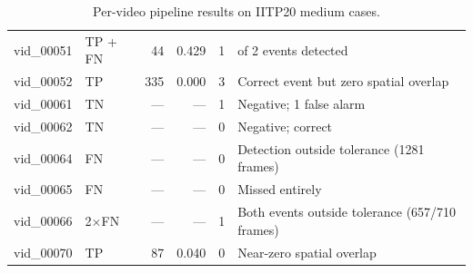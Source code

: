 \begin{table}[!htbp]
\begin{tabularx}{\textwidth}{l l r r c >{\raggedright\arraybackslash}X}
		\addlinespace
		vid\_00051     & TP + FN          & 44                   & 0.429        & 1                  & 1 of 2 events detected                         \\
		\addlinespace
		vid\_00052     & TP               & 335                  & 0.000        & 3                  & Correct event but zero spatial overlap         \\
		\addlinespace
		vid\_00061     & TN               & ---                  & ---          & 1                  & Negative; 1 false alarm                        \\
		\addlinespace
		vid\_00062     & TN               & ---                  & ---          & 0                  & Negative; correct                              \\
		\addlinespace
		vid\_00064     & FN               & ---                  & ---          & 0                  & Detection outside tolerance (1281 frames)      \\
		\addlinespace
		vid\_00065     & FN               & ---                  & ---          & 0                  & Missed entirely                                \\
		\addlinespace
		vid\_00066     & 2$\times$FN      & ---                  & ---          & 1                  & Both events outside tolerance (657/710 frames) \\
		\addlinespace
		vid\_00070     & TP               & 87                   & 0.040        & 0                  & Near-zero spatial overlap                      \\
		\bottomrule
	\end{tabularx}
	\caption{Per-video pipeline results on IITP20 medium cases.}
	\label{tab:eval_iitp20_medium}
\end{table}


